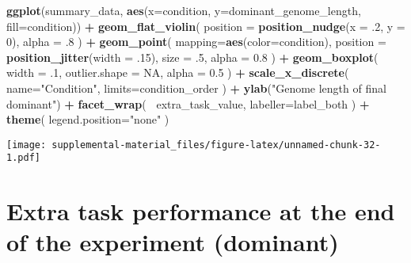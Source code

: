 \documentclass[]{book}
\newenvironment{Shaded}{\begin{snugshade}}{\end{snugshade}}
\newcommand{\DataTypeTok}[1]{\textcolor[rgb]{0.13,0.29,0.53}{#1}}
\newcommand{\DecValTok}[1]{\textcolor[rgb]{0.00,0.00,0.81}{#1}}
\newcommand{\FloatTok}[1]{\textcolor[rgb]{0.00,0.00,0.81}{#1}}
\newcommand{\KeywordTok}[1]{\textcolor[rgb]{0.13,0.29,0.53}{\textbf{#1}}}
\newcommand{\NormalTok}[1]{#1}
\newcommand{\OperatorTok}[1]{\textcolor[rgb]{0.81,0.36,0.00}{\textbf{#1}}}
\newcommand{\OtherTok}[1]{\textcolor[rgb]{0.56,0.35,0.01}{#1}}
\newcommand{\StringTok}[1]{\textcolor[rgb]{0.31,0.60,0.02}{#1}}
\begin{document}
\begin{Shaded}
\begin{Highlighting}[]
\KeywordTok{ggplot}\NormalTok{(summary_data, }\KeywordTok{aes}\NormalTok{(}\DataTypeTok{x=}\NormalTok{condition, }\DataTypeTok{y=}\NormalTok{dominant_genome_length, }\DataTypeTok{fill=}\NormalTok{condition)) }\OperatorTok{+}
\StringTok{  }\KeywordTok{geom_flat_violin}\NormalTok{(}
    \DataTypeTok{position =} \KeywordTok{position_nudge}\NormalTok{(}\DataTypeTok{x =} \FloatTok{.2}\NormalTok{, }\DataTypeTok{y =} \DecValTok{0}\NormalTok{),}
    \DataTypeTok{alpha =} \FloatTok{.8}
\NormalTok{  ) }\OperatorTok{+}
\StringTok{  }\KeywordTok{geom_point}\NormalTok{(}
    \DataTypeTok{mapping=}\KeywordTok{aes}\NormalTok{(}\DataTypeTok{color=}\NormalTok{condition),}
    \DataTypeTok{position =} \KeywordTok{position_jitter}\NormalTok{(}\DataTypeTok{width =} \FloatTok{.15}\NormalTok{),}
    \DataTypeTok{size =} \FloatTok{.5}\NormalTok{,}
    \DataTypeTok{alpha =} \FloatTok{0.8}
\NormalTok{  ) }\OperatorTok{+}
\StringTok{  }\KeywordTok{geom_boxplot}\NormalTok{(}
    \DataTypeTok{width =} \FloatTok{.1}\NormalTok{,}
    \DataTypeTok{outlier.shape =} \OtherTok{NA}\NormalTok{,}
    \DataTypeTok{alpha =} \FloatTok{0.5}
\NormalTok{  ) }\OperatorTok{+}
\StringTok{  }\KeywordTok{scale_x_discrete}\NormalTok{(}
    \DataTypeTok{name=}\StringTok{"Condition"}\NormalTok{,}
    \DataTypeTok{limits=}\NormalTok{condition_order}
\NormalTok{  ) }\OperatorTok{+}
\StringTok{  }\KeywordTok{ylab}\NormalTok{(}\StringTok{"Genome length of final dominant"}\NormalTok{) }\OperatorTok{+}
\StringTok{  }\KeywordTok{facet_wrap}\NormalTok{(}
    \OperatorTok{~}\NormalTok{extra_task_value,}
    \DataTypeTok{labeller=}\NormalTok{label_both}
\NormalTok{  ) }\OperatorTok{+}
\StringTok{  }\KeywordTok{theme}\NormalTok{(}
    \DataTypeTok{legend.position=}\StringTok{"none"}
\NormalTok{  )}
\end{Highlighting}
\end{Shaded}

\texttt{[image: supplemental-material\_files/figure-latex/unnamed-chunk-32-1.pdf]}

\hypertarget{extra-task-performance-at-the-end-of-the-experiment-dominant}{%
\section{Extra task performance at the end of the experiment (dominant)}\label{extra-task-performance-at-the-end-of-the-experiment-dominant}}
\end{document}

